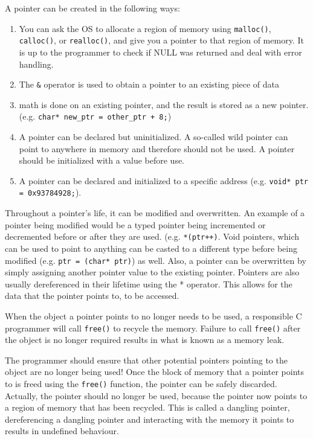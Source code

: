 A pointer can be created in the following ways:
\begin{enumerate}
  \item You can ask the OS to allocate a region of
    memory using \texttt{malloc()}, \texttt{calloc()}, or \texttt{realloc()},
    and give you a pointer to that region of memory. It is up to the programmer
    to check if NULL was returned and deal with error handling.
  \item The \texttt{\&} operator is used to obtain a pointer to an existing
    piece of data
  \item math is done on an existing pointer, and the result is stored as a new
    pointer. (e.g. \texttt{char* new\_ptr = other\_ptr + 8;})
  \item A pointer can be declared but uninitialized. A so-called wild pointer
    can point to anywhere in memory and therefore should not be used. A pointer
    should be initialized with a value before use.
  \item A pointer can be declared and initialized to a specific address (e.g.
    \texttt{void* ptr = 0x93784928;}).
\end{enumerate}

Throughout a pointer's life, it can be modified and overwritten. An example of a
pointer being modified would be a typed pointer being incremented or decremented
before or after they are used. (e.g. \texttt{*(ptr++)}. Void pointers, which can
be used to point to anything can be casted to a different type before being
modified (e.g. \texttt{ptr = (char* ptr)}) as well. Also, a pointer can be
overwritten by simply assigning another pointer value to the existing pointer.
Pointers are also usually dereferenced in their lifetime using the * operator.
This allows for the data that the pointer points to, to be accessed. 

When the object a pointer points to no longer needs to be used, a responsible C
programmer will call \texttt{free()} to recycle the memory. Failure to call
\texttt{free()} after the object is no longer required results in what is known
as a memory leak.

The programmer should ensure that other potential pointers pointing to the
object are no longer being used! Once the block of
memory that a pointer points to is freed using the \texttt{free()} function, the
pointer can be safely discarded. Actually, the pointer should no longer be used,
because the pointer now points to a region of memory that has been recycled.
This is called a dangling pointer, dereferencing a dangling pointer and
interacting with the memory it points to results in undefined behaviour. 
